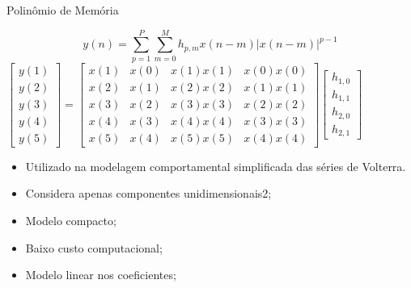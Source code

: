 \documentclass{if-beamer}
\begin{document}
\begin{frame}{Polinômio de Memória}
	\begin{minipage}{0.5\textwidth}
		\raggedleft
		\scriptsize
		\begin{equation}
			y(n) = \sum_{p=1}^{P} \sum_{m=0}^{M} h_{p,m} x(n-m) |x(n-m)|^{p-1}
		\end{equation}
			$
				\begin{bmatrix}
					y(1) \\
					y(2) \\
					y(3) \\
					y(4) \\
					y(5)
				\end{bmatrix}
				=
				\begin{bmatrix}
					x(1) & x(0) & x(1)x(1) & x(0)x(0) \\
					x(2) & x(1) & x(2)x(2) & x(1)x(1) \\
					x(3) & x(2) & x(3)x(3) & x(2)x(2) \\
					x(4) & x(3) & x(4)x(4) & x(3)x(3) \\
					x(5) & x(4) & x(5)x(5) & x(4)x(4)
				\end{bmatrix}
				\begin{bmatrix}
					h_{1,0} \\
					h_{1,1} \\
					h_{2,0} \\
					h_{2,1}
				\end{bmatrix}
			$
	
			
		
	\end{minipage}%
	\hspace{0.1\textwidth}
	\begin{minipage}{0.5\textwidth}
		\begin{itemize}
			\item Utilizado na modelagem comportamental simplificada das séries de Volterra.
			\item Considera apenas componentes unidimensionais2;
			\item Modelo compacto;
			\item Baixo custo computacional;
			\item Modelo linear nos coeficientes;
		\end{itemize}
	\end{minipage}
\end{frame}
\end{document}
